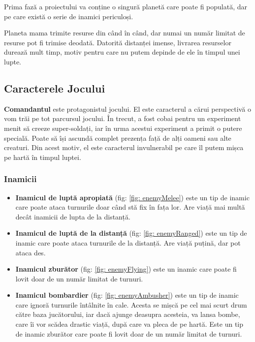 \documentclass[12pt, a4paper]{article}
\begin{document}
	Prima fază a proiectului va conține o singură planetă care poate fi populată, dar pe care există o serie de inamici periculoși.
	\newline
	
	Planeta mama trimite resurse din când în când, dar numai un număr limitat de resurse pot fi trimise deodată. Datorită distanței imense, livrarea resurselor durează mult timp, motiv pentru care nu putem depinde de ele în timpul unei lupte.
	
	
	
	
	
	\subsection{Caracterele Jocului}
	
	\textbf{Comandantul} este protagonistul jocului. El este caracterul a cărui perspectivă o vom trăi pe tot parcursul jocului. În trecut, a fost cobai pentru un experiment menit să creeze super-soldați, iar în urma acestui experiment a primit o putere specială. Poate să își ascundă complet prezența față de alți oameni sau alte creaturi. Din acest motiv, el este caracterul invulnerabil pe care îl putem mișca pe hartă în timpul luptei.
	
	
	
	
	
	\subsubsection{Inamicii}
	\begin{itemize}
		\item \textbf{Inamicul de luptă apropiată} (fig: \ref{fig: enemyMelee}) este un tip de inamic care poate ataca turnurile doar când stă fix în fața lor. Are viață mai multă decât inamicii de lupta de la distanță.
		\item \textbf{Inamicul de luptă de la distanță} (fig: \ref{fig: enemyRanged}) este un tip de inamic care poate ataca turnurile de la distanță. Are viață puțină, dar pot ataca des.
		\item \textbf{Inamicul zburător} (fig: \ref{fig: enemyFlying}) este un inamic care poate fi lovit doar de un număr limitat de turnuri.
		\item \textbf{Inamicul bombardier} (fig: \ref{fig: enemyAmbusher}) este un tip de inamic care ignoră turnurile întâlnite în cale. Acesta se mișcă pe cel mai scurt drum către baza jucătorului, iar dacă ajunge deasupra acesteia, va lansa bombe, care îi vor scădea drastic viață, după care va pleca de pe hartă. Este un tip de inamic zburător care poate fi lovit doar de un număr limitat de turnuri.
	\end{itemize}
	
\end{document}
